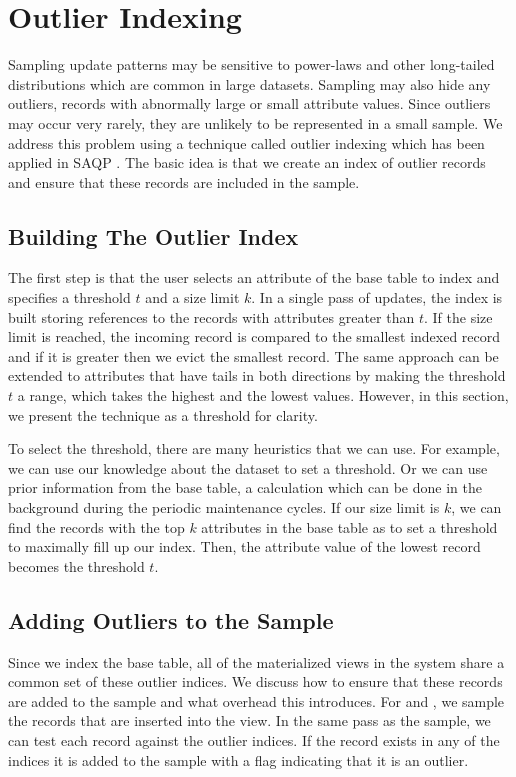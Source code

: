 \section{Outlier Indexing}\label{outlier}
Sampling update patterns may be sensitive to power-laws and other long-tailed distributions which are common in large datasets\cite{clauset2009power}.
Sampling may also hide any outliers, records with abnormally large or small attribute values.
Since outliers may occur very rarely, they are unlikely to be represented in a small sample. 
We address this problem using a technique called outlier indexing which has been applied in SAQP \cite{chaudhuri2001overcoming}.
The basic idea is that we create an index of outlier records and ensure that these records are included in the sample.

\subsection{Building The Outlier Index}
The first step is that the user selects an attribute of the base table to index and specifies a threshold $t$ and a size limit $k$.
In a single pass of updates, the index is built storing references to the records with attributes greater than $t$.
If the size limit is reached, the incoming record is compared to the smallest indexed record and if it is greater then we evict the smallest record.
The same approach can be extended to attributes that have tails in both directions by making the threshold $t$ a range, which takes the highest and the lowest values.
However, in this section, we present the technique as a threshold for clarity.

To select the threshold, there are many heuristics that we can use.
For example, we can use our knowledge about the dataset to set a threshold.
Or we can use prior information from the base table, a calculation which can be done in the background during the periodic maintenance cycles.
If our size limit is $k$, we can find the records with the top $k$ attributes in the base table as to set a threshold to maximally fill up our index. 
Then, the attribute value of the lowest record becomes the threshold $t$.

\subsection{Adding Outliers to the Sample}
Since we index the base table, all of the materialized views in the system share a common set of these outlier indices.
We discuss how to ensure that these records are added to the sample and what overhead this introduces.
For \spview and \fjview, we sample the records that are inserted into the view.
In the same pass as the sample, we can test each record against the outlier indices. 
If the record exists in any of the indices it is added to the sample with a flag indicating that it is an outlier.

